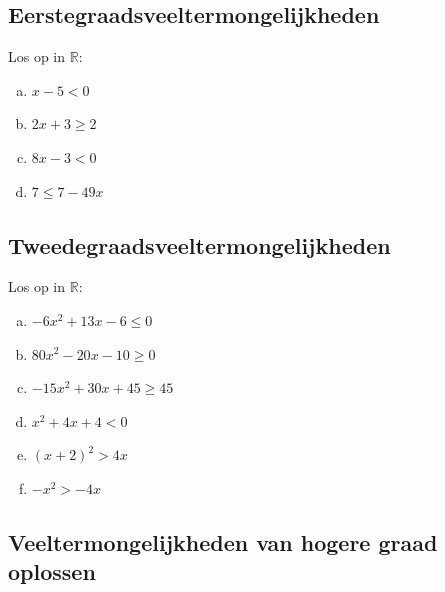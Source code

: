 \documentclass[12pt]{article}
\begin{document}
\begin{theorie}
\subsection{Eerstegraadsveeltermongelijkheden}
\end{theorie}

\begin{oefening}
Los op in $\mathbb{R}$:
\begin{multicols}{2}
\begin{enumerate}[(a)]
  \itemsep0.6em
  \item $x-5<0$
  \item $2x+3\geq 2$
  \item $8x-3<0$
  \item $7\leq 7-49x$
\end{enumerate}
\end{multicols}
\end{oefening}

\begin{theorie}
\subsection{Tweedegraadsveeltermongelijkheden}
\end{theorie}

\begin{oefening}
Los op in $\mathbb{R}$:
\begin{multicols}{2}
\begin{enumerate}[(a)]
  \itemsep0.6em
  \item $-6x^2+13x-6\leq 0$
  \item $80x^2-20x-10\geq 0$
  \item $-15x^2+30x+45\geq 45$
  \item $x^2+4x+4 < 0$
  \item $(x+2)^2 > 4x$
  \item $-x^2 > -4x$
\end{enumerate}
\end{multicols}
\end{oefening}


\begin{theorie}
\subsection{Veeltermongelijkheden van hogere graad oplossen}
\end{theorie}
\end{document}
